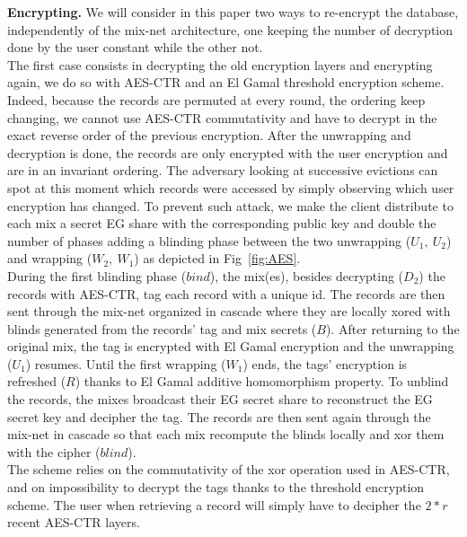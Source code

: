 \documentclass{llncs}
\begin{document}
\noindent\textbf{Encrypting.} We will consider in this paper two ways to re-encrypt the database, independently of the mix-net architecture, one keeping the number of decryption done by the user constant while the other not.\\
The first case consists in decrypting the old encryption layers and encrypting again, we do so with AES-CTR and an El Gamal threshold encryption scheme. Indeed, because the records are permuted at every round, the ordering keep changing, we cannot use AES-CTR commutativity and have to decrypt in the exact reverse order of the previous encryption. After the unwrapping and decryption is done, the records are only encrypted with the user encryption and are in an invariant ordering. The adversary looking at successive evictions can spot at this moment which records were accessed by simply observing which user encryption has changed. To prevent such attack, we make the client  distribute to each mix a secret EG share with the corresponding public key and double the number of phases adding a blinding phase between the two unwrapping ($U_1,\ U_2$) and wrapping ($W_2,\ W_1$) as depicted in Fig~\ref{fig:AES}. \\
During the first blinding phase ($bind$), the mix(es), besides decrypting ($D_2$) the records with AES-CTR, tag each record with a unique id. The records are then sent through the mix-net organized in cascade where they are locally xored with blinds generated from the records' tag and mix secrets ($B$). After returning to the original mix, the tag is encrypted with El Gamal encryption and the unwrapping ($U_1$) resumes. Until the first wrapping ($W_1$) ends, the tags' encryption is refreshed ($R$) thanks to El Gamal additive homomorphism property. To unblind the records, the mixes broadcast their EG secret share to reconstruct the EG secret key and decipher the tag. The records are then sent again through the mix-net in cascade so that each mix recompute the blinds locally and xor them with the cipher ($blind$).\\
The scheme relies on the commutativity of the xor operation used in AES-CTR, and on impossibility to decrypt the tags thanks to the threshold encryption scheme. 
The user when retrieving a record will simply have to decipher the $2*r$ recent AES-CTR layers.
\end{document}
